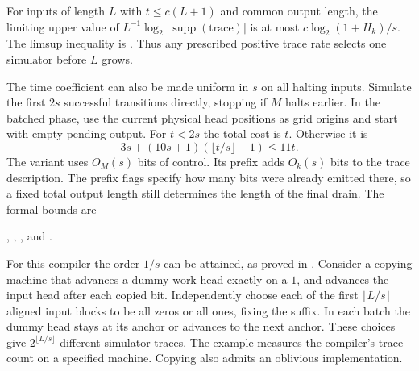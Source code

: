 For inputs of length $L$ with $t\le c(L+1)$ and common output length, the limiting upper value of $L^{-1}\log_2|\operatorname{supp}(\mathrm{trace})|$ is at most $c\log_2(1+H_k)/s$. The limsup inequality is . Thus any prescribed positive trace rate selects one simulator before $L$ grows.

The time coefficient can also be made uniform in $s$ on all halting inputs. Simulate the first $2s$ successful transitions directly, stopping if $M$ halts earlier. In the batched phase, use the current physical head positions as grid origins and start with empty pending output. For $t<2s$ the total cost is $t$. Otherwise it is
\[
 3s+(10s+1)(\lfloor t/s\rfloor-1)\le 11t .
\]
The variant uses $O_M(s)$ bits of control. Its prefix adds $O_k(s)$ bits
to the trace description. The prefix flags specify how many bits were
already emitted there, so a fixed total output length still determines
the length of the final drain. The formal bounds are
\par{\small\raggedright
{},
,
, and
.\par}

For this compiler the order $1/s$ can be attained, as proved in . Consider a copying machine that advances a dummy work head exactly on a $1$, and advances the input head after each copied bit. Independently choose each of the first $\lfloor L/s\rfloor$ aligned input blocks to be all zeros or all ones, fixing the suffix. In each batch the dummy head stays at its anchor or advances to the next anchor. These choices give $2^{\lfloor L/s\rfloor}$ different simulator traces. The example measures the compiler's trace count on a specified machine. Copying also admits an oblivious implementation.
